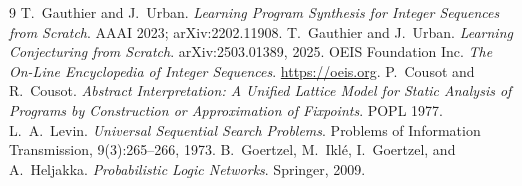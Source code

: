 \documentclass[11pt]{article}
\begin{document}
\begin{thebibliography}{9}
 T.~Gauthier and J.~Urban.
  \emph{Learning Program Synthesis for Integer Sequences from Scratch}.
  AAAI 2023; arXiv:2202.11908.
 T.~Gauthier and J.~Urban.
  \emph{Learning Conjecturing from Scratch}. arXiv:2503.01389, 2025.
 OEIS Foundation Inc.
  \emph{The On-Line Encyclopedia of Integer Sequences}. \url{https://oeis.org}.
 P.~Cousot and R.~Cousot.
  \emph{Abstract Interpretation: A Unified Lattice Model for Static Analysis of Programs by
  Construction or Approximation of Fixpoints}. POPL 1977.
 L.~A.~Levin.
  \emph{Universal Sequential Search Problems}. Problems of Information Transmission,
  9(3):265--266, 1973.
 B.~Goertzel, M.~Ikl\'e, I.~Goertzel, and A.~Heljakka.
  \emph{Probabilistic Logic Networks}. Springer, 2009.
\end{thebibliography}
\end{document}
